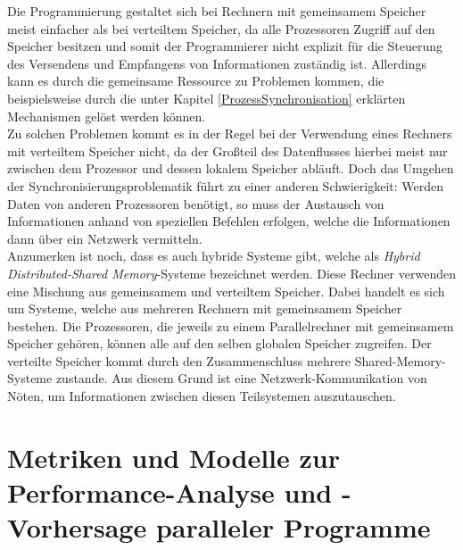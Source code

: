 				Die Programmierung gestaltet sich bei Rechnern mit gemeinsamem Speicher meist einfacher als bei verteiltem Speicher, da alle Prozessoren Zugriff auf den Speicher besitzen und somit der Programmierer nicht explizit für die Steuerung des Versendens und Empfangens von Informationen zuständig ist. Allerdings kann es durch die gemeinsame Ressource zu Problemen kommen, die beispielsweise durch die unter Kapitel \ref{ProzessSynchronisation} erklärten Mechanismen gelöst werden können.\\
				Zu solchen Problemen kommt es in der Regel bei der Verwendung eines Rechners mit verteiltem Speicher nicht, da der Großteil des Datenflusses hierbei meist nur zwischen dem Prozessor und dessen lokalem Speicher abläuft. Doch das Umgehen der Synchronisierungsproblematik führt zu einer anderen Schwierigkeit: Werden Daten von anderen Prozessoren benötigt, so muss der Austausch von Informationen anhand von speziellen Befehlen erfolgen, welche die Informationen dann über ein Netzwerk vermitteln. \cite{ParalleleNumerischeVerfahren}\\
				Anzumerken ist noch, dass es auch hybride Systeme gibt, welche als \textit{Hybrid Distributed-Shared Memory}-Systeme bezeichnet werden. Diese Rechner verwenden eine Mischung aus gemeinsamem und verteiltem Speicher. Dabei handelt es sich um Systeme, welche aus mehreren Rechnern mit gemeinsamem Speicher bestehen. Die Prozessoren, die jeweils zu einem Parallelrechner mit gemeinsamem Speicher gehören, können alle auf den selben globalen Speicher zugreifen. Der verteilte Speicher kommt durch den Zusammenschluss mehrere Shared-Memory-Systeme zustande. Aus diesem Grund ist eine Netzwerk-Kommunikation von Nöten, um Informationen zwischen diesen Teilsystemen auszutauschen. \cite{EntwicklungParallelerProgramme}
				
	\section{Metriken und Modelle zur Performance-Analyse und -Vorhersage paralleler Programme}
		
